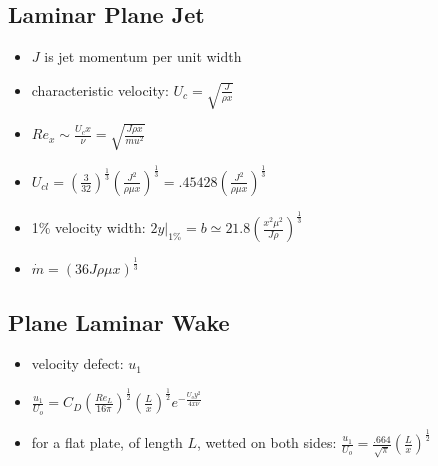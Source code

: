 \documentclass[a4paper]{article}
\begin{document}
    \subsection{Laminar Plane Jet}
        \begin{itemize}
            \item $J$ is jet momentum per unit width 
            \item characteristic velocity: $U_c = \sqrt{\frac{J}{\rho x}}$
            \item $Re_x \sim \frac{U_c x}{\nu} =\sqrt{\frac{J \rho x}{mu^2}}$
            \item $U_{cl} = \left(\frac{3}{32}\right)^{\frac{1}{3}} \left( \frac{J^2}{\rho \mu x} \right)^{\frac{1}{3}} %
            = .45428 \left( \frac{J^2}{\rho \mu x} \right)^{\frac{1}{3}}$
            \item 1\% velocity width: $2y \vert_{1\%} = b \simeq 21.8 \left( \frac{x^2 \mu^2}{J \rho} \right)^\frac{1}{3}$
            \item $\dot{m} = \left( 36 J \rho \mu x \right)^\frac{1}{3}$
        \end{itemize}

    \subsection{Plane Laminar Wake}
        \begin{itemize}
            \item velocity defect: $u_1$
            \item $\frac{u_1}{U_o} = C_D \left(\frac{Re_L}{16 \pi}\right)^\frac{1}{2} %
            \left( \frac{L}{x} \right)^\frac{1}{2} e^{-\frac{U_o y^2}{4x\nu}}$
            \item for a flat plate, of length $L$, wetted on both sides: $\frac{u_1}{U_o} = \frac{.664}{\sqrt{\pi}} \left( \frac{L}{x} \right)^\frac{1}{2}$
        \end{itemize}
\end{document}
